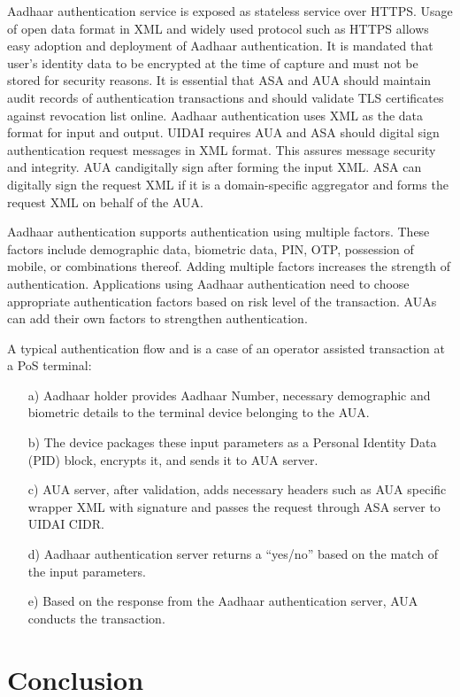 \begin{multicols}{2}
Aadhaar authentication service is exposed as stateless service over HTTPS. Usage of open data format in XML and widely used protocol such as HTTPS allows easy adoption and deployment of Aadhaar authentication. It is mandated that user's identity data to be encrypted at the time of capture and must not be stored for security reasons. It is essential that ASA and AUA should maintain audit records of authentication transactions and should validate TLS certificates against revocation list online. Aadhaar authentication uses XML as the data format for input and output. UIDAI requires AUA and ASA should digital sign authentication request messages in XML format. This assures message security and integrity. AUA can\break digitally sign after forming the input XML. ASA can digitally sign the request XML if it is a domain-specific aggregator and forms the request XML on behalf of the AUA.
 
Aadhaar authentication supports authentication using multiple factors. These factors include demographic data, biometric data, PIN, OTP, possession of mobile, or combinations thereof. Adding multiple factors increases the strength of authentication. Applications using Aadhaar authentication need to choose appropriate authentication factors based on risk level of the transaction. AUAs can add their own factors to strengthen authentication.
 
A typical authentication flow and is a case of an operator assisted transaction at a PoS terminal:
\begin{itemize}
\item[a)] Aadhaar holder provides Aadhaar Number, necessary demographic and biometric details to the terminal device belonging to the AUA.
\item[b)] The device packages these input parameters as a Personal Identity Data (PID) block, encrypts it, and sends it to AUA server.	
\item[c)] AUA server, after validation, adds necessary headers such as AUA specific wrapper XML with signature and passes the request through ASA server to UIDAI CIDR.	
\item[d)] Aadhaar authentication server returns a ``yes/no'' based on the match of the input parameters.
\item[e)] Based on the response from the Aadhaar authentication server, AUA conducts the transaction.
\end{itemize}

\section*{Conclusion}


\end{multicols}
